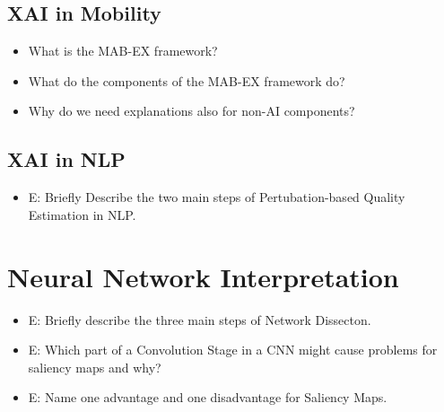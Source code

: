 \documentclass{report}
\begin{document}
		\subsection{XAI in Mobility}
		
		\begin{itemize}
		\item What is the MAB-EX framework?
		\item What do the components of the MAB-EX framework do?
		\item Why do we need explanations also for non-AI components?
		\end{itemize}
	
		\subsection{XAI in NLP}
		
		\begin{itemize}
		\item E: Briefly Describe the two main steps of Pertubation-based Quality Estimation in NLP.
		\newline 
		\end{itemize}
	
	\section{Neural Network Interpretation}
	
	\begin{itemize}
		\item E: Briefly describe the three main steps of Network Dissecton.
		\newline 
		\item E: Which part of a Convolution Stage in a CNN might cause problems for saliency maps and why?
		\newline 
		\item E: Name one advantage and one disadvantage for Saliency Maps.
		\newline 
	\end{itemize}
	
	
\end{document}
